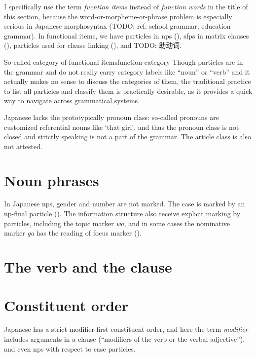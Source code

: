 \documentclass[UTF8, a4paper, oneside, scheme=plain]{ctexrep}
\newcommand*{\term}[1]{\emph{#1}}
\newcommand{\corpus}[1]{\emph{#1}}
\newcommand{\translate}[1]{`#1'}
\begin{document}
I specifically use the term \term{fucntion items} instead of \term{function words}
in the title of this section,
because the word-or-morpheme-or-phrase problem is especially serious in Japanese morphosyntax
(TODO: ref: school grammar, education grammar).
In functional items,
we have particles in \acs{np}s (),
\acs{sfp}s in matrix clauses (),
particles used for clause linking (),
and TODO: 助动词.

\begin{theorybox}{So-called category of functional items}{function-category}
    Though particles are in the grammar and do not really carry category labels like ``noun'' or ``verb''
    and it actually makes no sense to discuss the categories of them,
    the traditional practice to list all particles and classify them 
    is practically desirable, 
    as it provides a quick way to navigate across grammatical systems.
\end{theorybox}

Japanese lacks the prototypically pronoun class:
so-called pronouns are customized referential nouns like \translate{that girl},
and thus the pronoun class is not closed and strictly speaking is not a part of the grammar.
The article class is also not attested.

\section{Noun phrases}

In Japanese \acs{np}s, gender and number are not marked.
The case is marked by an \ac{np}-final particle ().
The information structure also receive explicit marking by particles,
including the topic marker \corpus{wa}, 
and in some cases the nominative marker \corpus{ga} has the reading of focus marker
().

\section{The verb and the clause}

\section{Constituent order}\label{sec:constituent-order}

Japanese has a strict modifier-first constituent order,
and here the term \term{modifier} includes 
arguments in a clause (``modifiers of the verb or the verbal adjective''),
and even \acs{np}s with respect to case particles.
\end{document}
